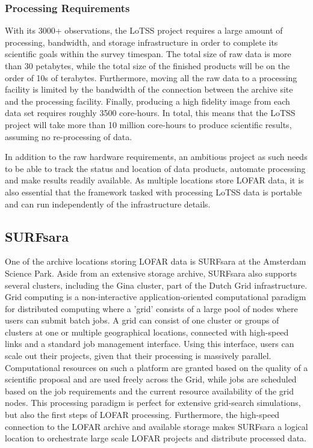\subsubsection{Processing Requirements}   

With its 3000+ observations, the LoTSS project requires a large amount of processing, bandwidth, and storage infrastructure in order to complete its scientific goals within the survey timespan. The total size of raw data is more than 30 petabytes, while the total size of the finished products will be on the order of 10s of terabytes. Furthermore, moving all the raw data to a processing facility is limited by the bandwidth of the connection between the archive site and the processing facility. Finally, producing a high fidelity image from each data set requires roughly 3500 core-hours. In total, this means that the LoTSS project will take more than 10 million core-hours to produce scientific results, assuming no re-processing of data. 
 
In addition to the raw hardware requirements, an ambitious project as such needs to be able to track the status and location of data products, automate processing and make results readily available. As multiple locations store LOFAR data,  it is also essential that the framework tasked with processing LoTSS data is portable and can run independently of the infrastructure details.



\subsection{SURFsara} 

One of the archive locations storing LOFAR data is SURFsara at the Amsterdam Science Park. Aside from an extensive storage archive, SURFsara also supports several clusters, including the Gina cluster, part of the Dutch Grid infrastructure. Grid computing is a non-interactive application-oriented computational paradigm for distributed computing where a 'grid' consists of a large pool of nodes where users can submit batch jobs. A grid can consist of one cluster or groups of clusters at one or multiple geographical locations, connected with high-speed links and a standard job management interface. Using this interface, users can scale out their projects, given that their processing is massively parallel. Computational resources on such a platform are granted based on  the quality of a scientific proposal and are used freely across the Grid, while jobs are scheduled based on the job requirements and the current resource availability of the grid nodes. This processing paradigm is perfect for extensive grid-search simulations, but also the first steps of LOFAR processing. Furthermore, the high-speed connection to the LOFAR archive  and available storage makes SURFsara a logical location to orchestrate large scale LOFAR projects and distribute processed data.


